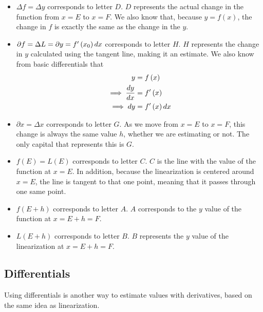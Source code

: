 \begin{itemize}
    \item \( \Delta f = \Delta y \) corresponds to letter \( D \). \( D \) represents the actual change in the function from \( x = E \) to \( x = F \). We also know that, because \( y = f \left( x \right) \), the change in \( f \) is exactly the same as the change in the \( y \).
    
    \item \( \partial f = \Delta L = \partial y = f^\prime \left( x_0 \right) dx \) corresponds to letter \( H \). \( H \) represents the change in \( y \) calculated using the tangent line, making it an estimate. We also know from basic differentials that
    \begin{align*}
        y &= f \left( x \right) \\
        \implies \dfrac{dy}{dx} &= f^\prime \left( x \right) \\
        \implies dy &= f^\prime \left( x \right) dx
    \end{align*}
    
    \item \( \partial x = \Delta x \) corresponds to letter \( G \). As we move from \( x = E \) to \( x = F \), this change is always the same value \( h \), whether we are estimating or not. The only capital that represents this is \( G \).
    
    \item \( f \left( E \right) = L \left( E \right) \) corresponds to letter \( C \). \( C \) is the line with the value of the function at \( x = E \). In addition, because the linearization is centered around \( x = E \), the line is tangent to that one point, meaning that it passes through one same point.
    
    \item \( f \left( E + h \right) \) corresponds to letter \( A \). \( A \) corresponds to the \( y \) value of the function at \( x = E + h = F \).
    
    \item \( L \left( E + h \right) \) corresponds to letter \( B \). \( B \) represents the \( y \) value of the linearization at \( x = E + h = F \).
\end{itemize}

\subsection{Differentials}

Using differentials is another way to estimate values with derivatives, based on the same idea as linearization.

